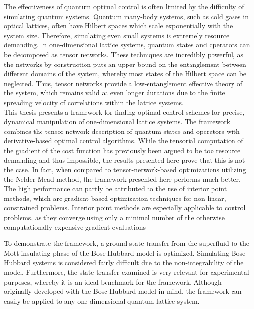 The effectiveness of quantum optimal control is often limited by the difficulty of simulating quantum systems. Quantum many-body systems, such as cold gases in optical lattices, often have Hilbert spaces which scale exponentially with the system size. Therefore, simulating even small systems is extremely resource demanding. In one-dimensional lattice systems, quantum states and operators can be decomposed as tensor networks. These techniques are incredibly powerful, as the networks by construction puts an upper bound on the entanglement between different domains of the system, whereby most states of the Hilbert space can be neglected. Thus, tensor networks provide a low-entanglement effective theory of the system, which remains valid at even longer durations due to the finite spreading velocity of correlations within the lattice systems.\\

This thesis presents a framework for finding optimal control schemes for precise, dynamical manipulation of one-dimensional lattice systems. The framework combines the tensor network description of quantum states and operators with derivative-based optimal control algorithms. While the tensorial computation of the gradient of the cost function has previously been argued to be too resource demanding and thus impossible, the results presented here prove that this is not the case. In fact, when compared to tensor-network-based optimizations utilizing the Nelder-Mead method, the framework presented here performs much better. The high performance can partly be attributed to the use of interior point methods, which are gradient-based optimization techniques for non-linear, constrained problems. Interior point methods are especially applicable to control problems, as they converge using only a minimal number of the otherwise computationally expensive gradient evaluations

To demonstrate the framework, a ground state transfer from the superfluid to the Mott-insulating phase of the Bose-Hubbard model is optimized. Simulating Bose-Hubbard systems is considered fairly difficult due to the non-integrability of the model. Furthermore, the state transfer examined is very relevant for experimental purposes, whereby it is an ideal benchmark for the framework. Although originally developed with the Bose-Hubbard model in mind, the framework can easily be applied to any one-dimensional quantum lattice system. 

